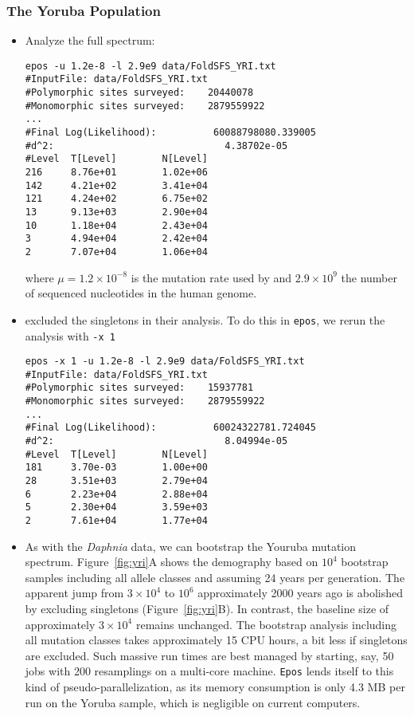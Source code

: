 \documentclass[a4paper, english]{article}
\newcommand{\ty}{\texttt}
\begin{document}
\subsubsection{The Yoruba Population}
\begin{itemize}
\item Analyze the full spectrum:
\begin{verbatim}
epos -u 1.2e-8 -l 2.9e9 data/FoldSFS_YRI.txt 
#InputFile:	data/FoldSFS_YRI.txt
#Polymorphic sites surveyed:	20440078
#Monomorphic sites surveyed:	2879559922
...
#Final Log(Likelihood):          60088798080.339005
#d^2:                              4.38702e-05
#Level  T[Level]        N[Level]
216     8.76e+01        1.02e+06
142     4.21e+02        3.41e+04
121     4.24e+02        6.75e+02
13      9.13e+03        2.90e+04
10      1.18e+04        2.43e+04
3       4.94e+04        2.42e+04
2       7.07e+04        1.06e+04
\end{verbatim}
where $\mu=1.2\times 10^{-8}$ is the mutation rate used by
\cite{lap17:acc} and $2.9\times 10^9$ the number of sequenced
nucleotides in the human genome.
\item \cite{lap17:acc} excluded
the singletons in their analysis. To do this in \ty{epos}, we rerun the analysis with
\ty{-x 1}
\begin{verbatim}
epos -x 1 -u 1.2e-8 -l 2.9e9 data/FoldSFS_YRI.txt 
#InputFile:	data/FoldSFS_YRI.txt
#Polymorphic sites surveyed:	15937781
#Monomorphic sites surveyed:	2879559922
...
#Final Log(Likelihood):          60024322781.724045
#d^2:                              8.04994e-05
#Level  T[Level]        N[Level]
181     3.70e-03        1.00e+00
28      3.51e+03        2.79e+04
6       2.23e+04        2.88e+04
5       2.30e+04        3.59e+03
2       7.61e+04        1.77e+04
\end{verbatim}
\item As with the \textit{Daphnia} data, we can bootstrap the Youruba
  mutation spectrum. Figure~\ref{fig:yri}A shows the demography based on $10^4$
  bootstrap samples including all allele classes and assuming 24 years
  per generation. The apparent jump from $3\times 10^4$ to $10^6$
  approximately 2000 years ago is abolished by
  excluding singletons (Figure~\ref{fig:yri}B). In contrast, the
  baseline size of approximately $3\times 10^4$ remains unchanged. The bootstrap analysis
  including all mutation classes takes approximately 15 CPU hours, a
  bit less if singletons are excluded. Such massive run times are
  best managed by starting, say, 50 jobs with 200 resamplings on a
  multi-core machine. \ty{Epos} lends itself to this kind of
  pseudo-parallelization, as its memory consumption is only 4.3 MB per
  run on the Yoruba sample, which is negligible on current computers.
\end{itemize}
\end{document}
